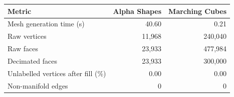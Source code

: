 \begin{tabular}{lrr}
\toprule
Metric & Alpha Shapes & Marching Cubes \\
\midrule
Mesh generation time (s) & 40.60 & 0.21 \\
Raw vertices & 11,968 & 240,040 \\
Raw faces & 23,933 & 477,984 \\
Decimated faces & 23,933 & 300,000 \\
Unlabelled vertices after fill (\%) & 0.00 & 0.00 \\
Non-manifold edges & 0 & 0 \\
\bottomrule
\end{tabular}
